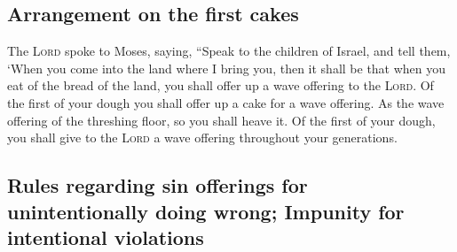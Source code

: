 \hypertarget{arrangement-on-the-first-cakes}{%
\subsection{Arrangement on the first
cakes}\label{arrangement-on-the-first-cakes}}

 The \textsc{Lord} spoke to Moses, saying,
 ``Speak to the children of Israel, and tell them, `When
you come into the land where I bring you,  then it shall
be that when you eat of the bread of the land, you shall offer up a wave
offering to the \textsc{Lord}.  Of the first of your
dough you shall offer up a cake for a wave offering. As the wave
offering of the threshing floor, so you shall heave it. 
Of the first of your dough, you shall give to the \textsc{Lord} a wave
offering throughout your generations.

\hypertarget{rules-regarding-sin-offerings-for-unintentionally-doing-wrong-impunity-for-intentional-violations}{%
\subsection{Rules regarding sin offerings for unintentionally doing
wrong; Impunity for intentional
violations}\label{rules-regarding-sin-offerings-for-unintentionally-doing-wrong-impunity-for-intentional-violations}}

